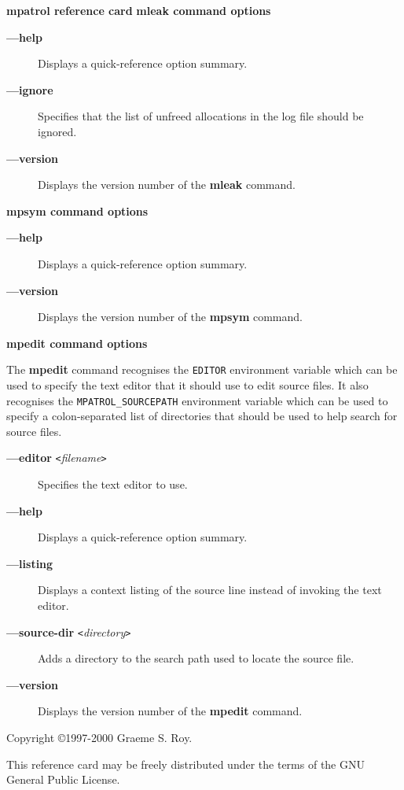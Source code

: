 \documentclass[a4paper,landscape,final]{article}
\newcommand{\heading}[1]{\textbf{\normalsize #1}}
\newcommand{\command}[1]{\textbf{#1}}
\newcommand{\flag}[1]{\textbf{---#1}}
\newcommand{\flagpar}[2]{\flag{#1} \texttt{<}\textit{#2}\texttt{>}}
\begin{document}
\begin{multicols}{3}{\textbf{\Large mpatrol reference card}}
\vskip 12pt
\heading{mleak command options}
\vskip 6pt

\begin{description}
\item[\flag{help}]
Displays a quick-reference option summary.
\item[\flag{ignore}]
Specifies that the list of unfreed allocations in the log file should be
ignored.
\item[\flag{version}]
Displays the version number of the \command{mleak} command.
\end{description}

\vskip 12pt
\heading{mpsym command options}
\vskip 6pt

\begin{description}
\item[\flag{help}]
Displays a quick-reference option summary.
\item[\flag{version}]
Displays the version number of the \command{mpsym} command.
\end{description}

\vskip 12pt
\heading{mpedit command options}
\vskip 6pt

The \command{mpedit} command recognises the \texttt{EDITOR} environment variable
which can be used to specify the text editor that it should use to edit source
files.  It also recognises the \texttt{MPATROL\_SOURCEPATH} environment variable
which can be used to specify a colon-separated list of directories that should
be used to help search for source files.

\begin{description}
\item[\flagpar{editor}{filename}]
Specifies the text editor to use.
\item[\flag{help}]
Displays a quick-reference option summary.
\item[\flag{listing}]
Displays a context listing of the source line instead of invoking the text
editor.
\item[\flagpar{source-dir}{directory}]
Adds a directory to the search path used to locate the source file.
\item[\flag{version}]
Displays the version number of the \command{mpedit} command.
\end{description}

\vskip 12pt
Copyright \copyright 1997-2000 Graeme S. Roy.
\vskip 6pt

This reference card may be freely distributed under the terms of the GNU General
Public License.

\end{multicols}
\end{document}
